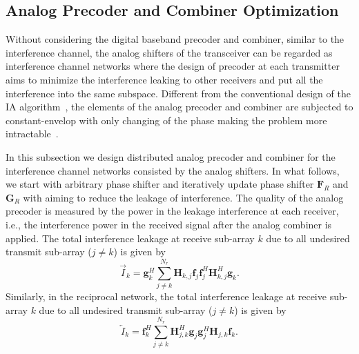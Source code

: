 \documentclass[11pt,draftcls,onecolumn]{IEEEtran}
\begin{document}
\subsection{Analog Precoder and Combiner Optimization}

Without considering the digital baseband precoder and combiner, similar to the interference channel, the analog shifters of the transceiver can be regarded as interference channel networks where the design of precoder at each transmitter aims to minimize the interference leaking to other receivers and put all the interference into the same subspace. Different from the conventional design of the IA algorithm~\cite{TITGou2010,TITGoma2011}, the elements of the analog precoder and combiner are subjected to constant-envelop with only changing of the phase making the problem more intractable~\cite{TWCMoh2012}.

In this subsection we design distributed analog precoder and combiner for the interference channel networks consisted by the analog shifters. In what follows, we start with arbitrary phase shifter and iteratively update phase shifter $\bm{F}_{R}$ and $\bm{G}_{R}$ with aiming to reduce the leakage of interference. The quality of the analog precoder is measured by the power in the leakage interference at each receiver, i.e., the interference power in the received signal after the analog combiner is applied. The total interference leakage at receive sub-array $k$ due to all undesired transmit sub-array ($j\neq k$) is given by
$$\overrightarrow{I}_{k}=\bm{g}_{k}^{H}\sum_{j\neq k}^{N_{r}}\bm{H}_{k,j}\bm{f}_{j}\bm{f}_{j}^{H}\bm{H}_{k,j}^{H}\bm{g}_{k}.$$
Similarly, in the reciprocal network,  the total interference leakage at receive sub-array $k$ due to all undesired transmit sub-array ($j\neq k$) is given by
$$\overleftarrow{I}_{k}=\bm{f}_{k}^{H}\sum_{j\neq k}^{N_{r}}\bm{H}_{j,k}^{H}\bm{g}_{j}\bm{g}_{j}^{H}\bm{H}_{j,k}\bm{f}_{k}.$$
\end{document}

